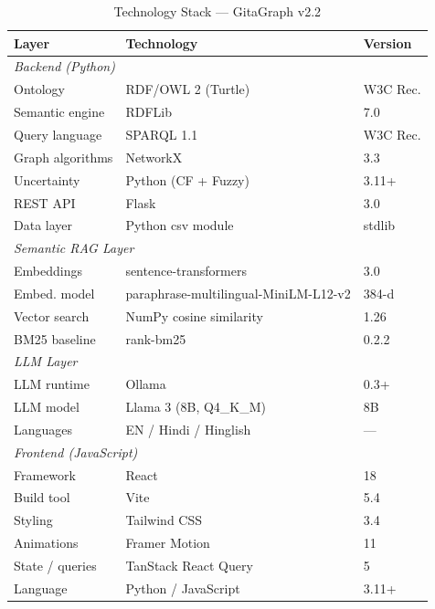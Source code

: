 \documentclass[conference]{IEEEtran}
\begin{document}
\begin{table}[htbp]
\caption{Technology Stack — GitaGraph v2.2}
\label{tab:tech}
\centering
\begin{tabular}{p{2.8cm}p{5.2cm}p{2.0cm}}
\toprule
\textbf{Layer} & \textbf{Technology} & \textbf{Version} \\
\midrule
\multicolumn{3}{l}{\textit{Backend (Python)}} \\
Ontology          & RDF/OWL 2 (Turtle)        & W3C Rec. \\
Semantic engine   & RDFLib                    & 7.0 \\
Query language    & SPARQL 1.1                & W3C Rec. \\
Graph algorithms  & NetworkX                  & 3.3 \\
Uncertainty       & Python (CF + Fuzzy)       & 3.11+ \\
REST API          & Flask                     & 3.0 \\
Data layer        & Python csv module          & stdlib \\
\multicolumn{3}{l}{\textit{Semantic RAG Layer}} \\
Embeddings        & sentence-transformers     & 3.0 \\
Embed. model      & paraphrase-multilingual-MiniLM-L12-v2 & 384-d \\
Vector search     & NumPy cosine similarity    & 1.26 \\
BM25 baseline     & rank-bm25                 & 0.2.2 \\
\multicolumn{3}{l}{\textit{LLM Layer}} \\
LLM runtime       & Ollama                    & 0.3+ \\
LLM model         & Llama 3 (8B, Q4\_K\_M)    & 8B \\
Languages         & EN / Hindi / Hinglish     & — \\
\multicolumn{3}{l}{\textit{Frontend (JavaScript)}} \\
Framework         & React                     & 18 \\
Build tool        & Vite                      & 5.4 \\
Styling           & Tailwind CSS              & 3.4 \\
Animations        & Framer Motion             & 11 \\
State / queries   & TanStack React Query      & 5 \\
\midrule
Language          & Python / JavaScript       & 3.11+ \\
\bottomrule
\end{tabular}
\end{table}
\end{document}
